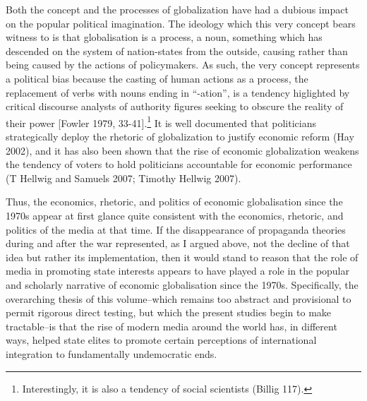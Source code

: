 \documentclass[12pt,book]{article}
\begin{document}
Both the concept and the processes of globalization have had a dubious
impact on the popular political imagination. The ideology which this
very concept bears witness to is that globalisation is a process, a
noun, something which has descended on the system of nation-states from
the outside, causing rather than being caused by the actions of
policymakers. As such, the very concept represents a political bias
because the casting of human actions as a process, the replacement of
verbs with nouns ending in ``-ation'', is a tendency higlighted by
critical discourse analysts of authority figures seeking to obscure the
reality of their power {[}Fowler 1979, 33-41{]}.\footnote{Interestingly,
  it is also a tendency of social scientists (Billig 117).} It is well
documented that politicians strategically deploy the rhetoric of
globalization to justify economic reform (Hay 2002), and it has also
been shown that the rise of economic globalization weakens the tendency
of voters to hold politicians accountable for economic performance (T
Hellwig and Samuels 2007; Timothy Hellwig 2007).

Thus, the economics, rhetoric, and politics of economic globalisation
since the 1970s appear at first glance quite consistent with the
economics, rhetoric, and politics of the media at that time. If the
disappearance of propaganda theories during and after the war
represented, as I argued above, not the decline of that idea but rather
its implementation, then it would stand to reason that the role of media
in promoting state interests appears to have played a role in the
popular and scholarly narrative of economic globalisation since the
1970s. Specifically, the overarching thesis of this volume--which
remains too abstract and provisional to permit rigorous direct testing,
but which the present studies begin to make tractable--is that the rise
of modern media around the world has, in different ways, helped state
elites to promote certain perceptions of international integration to
fundamentally undemocratic ends.
\end{document}
